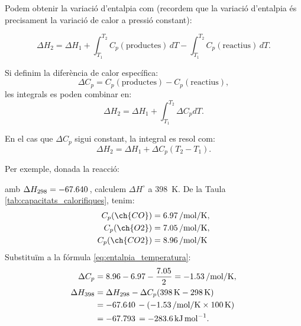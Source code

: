 Podem obtenir la variació d'entalpia com (recordem que la variació d'entalpia és precisament la variació de calor a pressió constant):

\begin{equation}
    \Delta H_2 = \Delta H_1 + \int_{T_1}^{T_2} C_p(\text{productes})\, dT - \int_{T_1}^{T_2} C_p(\text{reactius})\, dT.
\end{equation}

Si definim la diferència de calor específica:
\begin{equation}
    \Delta C_p = C_p(\text{productes}) - C_p(\text{reactius}),
\end{equation}
les integrals es poden combinar en:
\begin{equation}
    \Delta H_2 = \Delta H_1 + \int_{T_1}^{T_2} \Delta C_p dT.
\end{equation}

En el cas que $\Delta C_p$ sigui constant, la integral es resol com:
\begin{equation}
    \Delta H_2 = \Delta H_1 + \Delta C_p (T_2 - T_1).
    \label{eq:entalpia_temperatura}
\end{equation}

\begin{EXMP}
    Per exemple, donada la reacció:
    \begin{center}
    \end{center}
amb $\Delta H_{298} = \qty{-67.640}{\cal}$, calculem $\Delta H^\circ$ a \qty{398}{\kelvin}. De la Taula \ref{tab:capacitats_calorifiques}, tenim:   
\begin{align*}
    C_p(\ch{CO}) &= \qty{6.97}{\cal\per\mole\per\kelvin},\\
    C_p(\ch{O2}) &= \qty{7.05}{\cal\per\mole\per\kelvin},\\
    C_p(\ch{CO2}) &= \qty{8.96}{\cal\per\mole\per\kelvin}
\end{align*}
Substituïm a la fórmula \ref{eq:entalpia_temperatura}:
\begin{align*}
    \Delta C_p &= 8.96 - 6.97 - \frac{7.05}{2} = \qty{-1.53}{\cal\per\mole\per\kelvin},\\
    \Delta H_{398} &= \Delta H_{298} - \Delta C_p (\qty{398}{\kelvin} - \qty{298}{\kelvin})\\
    &= \qty{-67.640}{\cal} - (\qty{-1.53}{\cal\per\mole\per\kelvin} \times \qty{100}{\kelvin})\\
    &= \qty{-67.793}{\cal} = \qty{-283.6}{\kilo\joule\per\mole}.    
\end{align*}
\end{EXMP}
 
